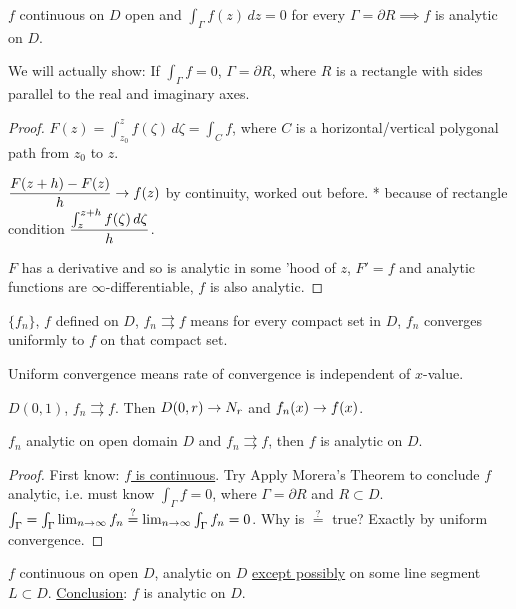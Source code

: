\documentclass[]{article}
\begin{document}
\begin{theorem}
	 $f$ continuous on $D$ open and $\int_{\Gamma} f(z) \, dz = 0$ for every $\Gamma = \partial R \implies f$ is analytic on $D$.
\end{theorem}
\begin{remark}
	We will actually show: If $\int_{\Gamma} f = 0$, $\Gamma = \partial R$, where $R$ is a rectangle with sides parallel to the real and imaginary axes.
\end{remark}
\begin{proof}
	$F(z) = \int_{z_0}^z f(\zeta) \, d\zeta = \int_C f$, where $C$ is a horizontal/vertical polygonal path from $z_0$ to $z$.

	$\displaystyle\frac{F(z+h)-F(z)}{h} \rightarrow f(z)$ by continuity, worked out before. * because of rectangle condition $\displaystyle\frac{\int_z^{z+h} f(\zeta)\, d\zeta}{h}$. 
	
	$F$ has a derivative and so is analytic in some 'hood of $z$, $F'=f$ and analytic functions are $\infty$-differentiable, $f$ is also analytic.
\end{proof}
\begin{definition}
	$\{f_n\}$, $f$ defined on $D$, $f_n \rightrightarrows f$  means for every compact set in $D$, $f_n$ converges uniformly to $f$ on that compact set.
\end{definition}
\begin{recall}
	Uniform convergence means rate of convergence is independent of $x$-value.
\end{recall}
\begin{example}
	$D(0,1)$, $f_n \rightrightarrows f$. Then $D(0,r) \rightarrow N_r$ and $f_n(x) \rightarrow f(x)$.
\end{example}
\begin{theorem}
	$f_n$ analytic on open domain $D$ and $f_n \rightrightarrows f$, then $f$ is analytic on $D$.
\end{theorem}
\begin{proof}
	First know: \underline{$f$ is continuous}. Try Apply Morera's Theorem to conclude $f$ analytic, i.e. must know $\int_{\Gamma} f = 0$, where $\Gamma = \partial R$ and $R\subset D$. $\int_{\Gamma} = \int_{\Gamma} \lim_{n\rightarrow \infty} f_n \overset{?}{=} \lim_{n\rightarrow\infty} \int_{\Gamma} f_n = 0$. Why is $\overset{?}{=}$ true? Exactly by uniform convergence.
\end{proof}
\begin{theorem}
	$f$ continuous on open $D$, analytic on $D$ \underline{except possibly} on some line segment $L\subset D$. \underline{Conclusion}: $f$ is analytic on $D$.
\end{theorem}
\end{document}
